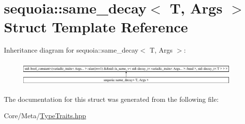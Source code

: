 \hypertarget{structsequoia_1_1same__decay}{}\section{sequoia\+::same\+\_\+decay$<$ T, Args $>$ Struct Template Reference}
\label{structsequoia_1_1same__decay}
Inheritance diagram for sequoia\+::same\+\_\+decay$<$ T, Args $>$\+:\begin{figure}[H]
\begin{center}
\leavevmode
\includegraphics[height=1.317647cm]{structsequoia_1_1same__decay}
\end{center}
\end{figure}


The documentation for this struct was generated from the following file\+:\begin{DoxyCompactItemize}
\item 
Core/\+Meta/\mbox{\hyperlink{_type_traits_8hpp}{Type\+Traits.\+hpp}}\end{DoxyCompactItemize}
